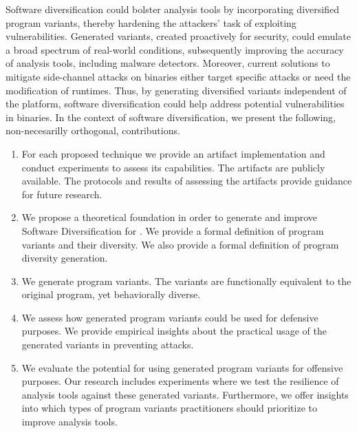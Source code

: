 Software diversification could bolster \Wasm analysis tools by incorporating diversified program variants, thereby hardening the attackers' task of exploiting vulnerabilities. 
Generated variants, created proactively for security, could emulate a broad spectrum of real-world conditions, subsequently improving the accuracy of \Wasm analysis tools, including \Wasm malware detectors. 
Moreover, current solutions to mitigate side-channel attacks on \Wasm binaries either target specific attacks or need the modification of runtimes. 
Thus, by generating diversified variants independent of the platform, software diversification could help address potential vulnerabilities in \Wasm binaries. 
In the context of software diversification, we present the following, non-necesarilly orthogonal, contributions.

\begin{enumerate}[label=\textbf{C\arabic*}, ref=C\arabic*]
	\item \label{methodcontrib}  For each proposed technique we provide an artifact implementation and conduct experiments to assess its capabilities. The artifacts are publicly available. The protocols and results of assessing the artifacts provide guidance for future research.
	
	\item \label{therycontrib}  We propose a theoretical foundation in order to generate and improve Software Diversification for \Wasm. We provide a formal definition of \Wasm program variants and their diversity. We also provide a formal definition of \Wasm program diversity generation.
	
	\item \label{generationcontrib}  We generate \Wasm program variants. The variants are functionally equivalent to the original program, yet behaviorally diverse.
	
	\item \label{defensivecontrib}  We assess how generated \Wasm program variants could be used for defensive purposes. We provide empirical insights about the practical usage of the generated variants in preventing attacks.
	
	\item \label{ofensivecontrib}  
	We evaluate the potential for using generated \Wasm program variants for offensive purposes. 
	Our research includes experiments where we test the resilience of \Wasm analysis tools against these generated variants. 
	Furthermore, we offer insights into which types of program variants practitioners should prioritize to improve \Wasm analysis tools.

	
\end{enumerate}

